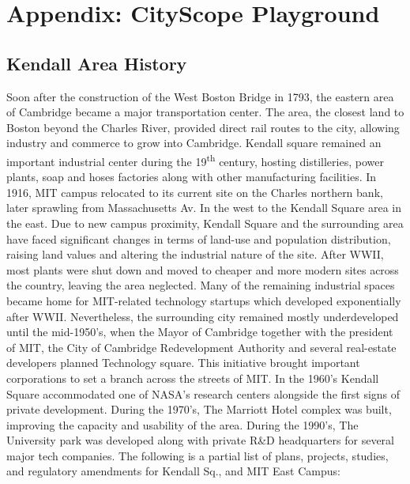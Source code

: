 
\section{Appendix: CityScope Playground} \label{appendix:playground}

{

    \subsection{Kendall Area History}

    {
        Soon after the construction of the West Boston Bridge in 1793, the eastern area of Cambridge became a major transportation center. The area, the closest land to Boston beyond the Charles River, provided direct rail routes to the city, allowing industry and commerce to grow into Cambridge. Kendall square remained an important industrial center during the 19\textsuperscript{th} century, hosting distilleries, power plants, soap and hoses factories along with other manufacturing facilities.
        \newline
        In 1916, MIT campus relocated to its current site on the Charles northern bank, later sprawling from Massachusetts Av. In the west to the Kendall Square area in the east. Due to new campus proximity, Kendall Square and the surrounding area have faced significant changes in terms of land-use and population distribution, raising land values and altering the industrial nature of the site. After WWII, most plants were shut down and moved to cheaper and more modern sites across the country, leaving the area neglected. Many of the remaining industrial spaces became home for MIT-related technology startups which developed exponentially after WWII. Nevertheless, the surrounding city remained mostly underdeveloped until the mid-1950's, when the Mayor of Cambridge together with the president of MIT, the City of Cambridge Redevelopment Authority and several real-estate developers planned Technology square. This initiative brought important corporations to set a branch across the streets of MIT. In the 1960's Kendall Square accommodated one of NASA's research centers alongside the first signs of private development. During the 1970's, The Marriott Hotel complex was built, improving the capacity and usability of the area. During the 1990's, The University park was developed along with private R\&D headquarters for several major tech companies.
        \newline
        The following is a partial list of plans, projects, studies, and regulatory amendments for Kendall Sq., and MIT East Campus:

}}
